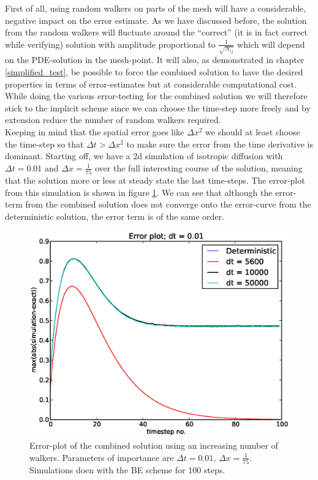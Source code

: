 First of all, using random walkers on parts of the mesh will have a considerable, negative impact on the error estimate. 
As we have discussed before, the solution from the random walkers will fluctuate around the ``correct'' (it is in fact correct while verifying) solution with amplitude proportional to $\frac{1}{\sqrt{N_{ij}}}$ which will depend on the PDE-solution in the mesh-point. 
It will also, as demonstrated in chapter \ref{simplified_test}, be possible to force the combined solution to have the desired properties in terms of error-estimates but at considerable computational cost. 
While doing the various error-testing for the combined solution we will therefore stick to the implicit scheme since we can choose the time-step more freely and by extension reduce the number of random walkers required.\\
Keeping in mind that the spatial error goes like $\Delta x^2$ we should at least choose the time-step so that $\Delta t> \Delta x^2$ to make sure the error from the time derivative is dominant. 
Starting off, we have a 2d simulation of isotropic diffusion with $\Delta t = 0.01$ and $\Delta x = \frac{1}{75}$ over the full interesting course of the solution, meaning that the solution more or less at steady state the last time-steps. The error-plot from this simulation is shown in figure \ref{errorplot_combined_BE2d}. We can see that although the error-term from the combined solution does not converge onto the error-curve from the deterministic solution, the error term is of the same order. 
\begin{figure}[H]
 \centering
 \includegraphics[scale=0.7]{../doc/results/experiment_17022014_1541/results/errorplot.eps}
 \caption{Error-plot of the combined solution using an increasing number of walkers. Parameters of importance are $\Delta t = 0.01$, $\Delta x = \frac{1}{75}$. Simulations doen with the BE scheme for 100 steps.}
 \label{errorplot_combined_BE2d}
\end{figure}

